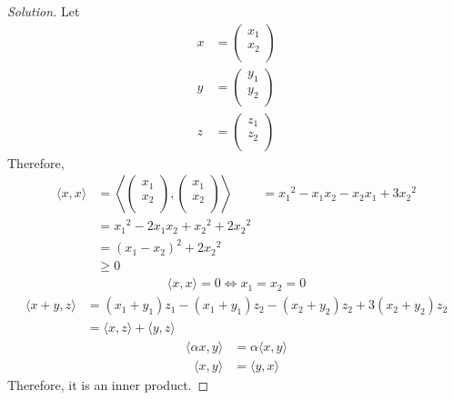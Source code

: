 \documentclass[fleqn, a4paper, 12pt]{article}
\theoremstyle{definition}
\theoremstyle{theorem}
\newenvironment{solution}
{\begin{proof}[Solution]\let\qed\relax}
	{\end{proof}}
\begin{document}
\begin{solution}
	Let
	\begin{align*}
		x &= 
			\begin{pmatrix}
				x_1\\
				x_2\\
			\end{pmatrix}\\
		y &= 
			\begin{pmatrix}
				y_1\\
				y_2\\
			\end{pmatrix}\\
		z &= 
			\begin{pmatrix}
				z_1\\
				z_2\\
			\end{pmatrix}
	\end{align*}
	Therefore,
	\begin{align*}
		\langle x, x \rangle &= 
			\left\langle
				\begin{pmatrix}
					x_1\\
					x_2\\
				\end{pmatrix}
				,
				\begin{pmatrix}
					x_1\\
					x_2\\
				\end{pmatrix}
			\right\rangle
		&= {x_1}^2 - x_1 x_2 - x_2 x_1 + 3 {x_2}^2\\
		&= {x_1}^2 - 2 x_1 x_2 + {x_2}^2 + 2 {x_2}^2\\
		&= (x_1 - x_2)^2 + 2 {x_2}^2\\
		&\geq 0
	\end{align*}
	\begin{align*}
		\langle x, x \rangle = 0 \iff x_1 = x_2 = 0
	\end{align*}
	\begin{align*}
		\langle x + y, z \rangle &= (x_1 + y_1) z_1 - (x_1 + y_1) z_2 - (x_2 + y_2) z_2 + 3 (x_2 + y_2) z_2\\
		&= \langle x, z \rangle + \langle y, z \rangle
	\end{align*}
	\begin{align*}
		\langle \alpha x, y \rangle &= \alpha \langle x, y \rangle
	\end{align*}
	\begin{align*}
		\langle x, y \rangle &= \langle y, x \rangle
	\end{align*}
	Therefore, it is an inner product.
\end{solution}
\end{document}
